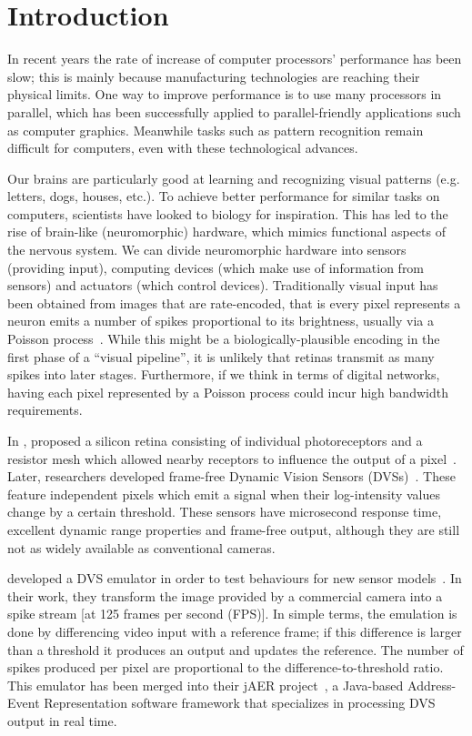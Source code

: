 \documentclass[conference]{IEEEtran}
\begin{document}
\section{Introduction}

In recent years the rate of increase of computer processors' performance has been slow; this is mainly because manufacturing technologies are reaching their physical limits. One way to improve performance is to use many processors in parallel, which has been successfully applied to parallel-friendly applications such as computer graphics. Meanwhile tasks such as pattern recognition remain difficult for computers, even with these technological advances.

Our brains are particularly good at learning and recognizing visual patterns (e.g. letters, dogs, houses, etc.). To achieve better performance for similar tasks on computers, scientists have looked to biology for inspiration. This has led to the rise of brain-like (neuromorphic) hardware, which mimics functional aspects of the nervous system. We can divide neuromorphic hardware into sensors (providing input), computing devices (which make use of information from sensors) and actuators (which control devices). Traditionally visual input has been obtained from images that are rate-encoded, that is every pixel represents a neuron emits a number of spikes proportional to its brightness, usually via a Poisson process~\cite{snyder2012random}. While this might be a biologically-plausible encoding in the first phase of a ``visual pipeline'', it is unlikely that retinas transmit as many spikes into later stages. Furthermore, if we think in terms of digital networks, having each pixel represented by a Poisson process could incur high bandwidth requirements. 

In \citeyear{Mead1989}, \citeauthor{Mead1989} proposed a silicon retina consisting of individual photoreceptors and a resistor mesh which allowed nearby receptors to influence the output of a pixel~\cite{Mead1989}. 
Later, researchers developed frame-free Dynamic Vision Sensors (DVSs)~\cite{delbruckDVS,bernabeDVS}. These feature independent pixels which emit a signal when their log-intensity values change by a certain threshold.
These sensors have microsecond response time, excellent dynamic range properties and frame-free output, although they are still not as widely available as conventional cameras.

\citeauthor{DVSemu} developed a DVS emulator in order to test behaviours for new sensor models~\cite{DVSemu}. In their work, they transform the image provided by a commercial camera into a spike stream [at 125 frames per second (FPS)]. In simple terms, the emulation is done by differencing video input with a reference frame; if this difference is larger than a threshold it produces an output and updates the reference. The number of spikes produced per pixel are proportional to the difference-to-threshold ratio. This emulator has been merged into their jAER project~\cite{delbruck2008frame}, a Java-based Address-Event Representation software framework that specializes in processing DVS output in real time.
\end{document}
